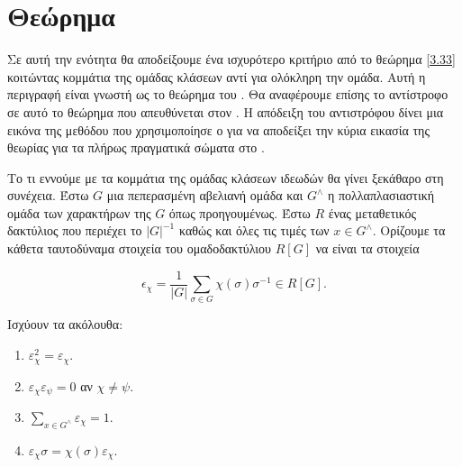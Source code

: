 \section{Θεώρημα }


\noindent Σε αυτή την ενότητα θα αποδείξουμε ένα ισχυρότερο κριτήριο από το θεώρημα \ref{3.33} κοιτώντας κομμάτια της ομάδας 
κλάσεων αντί για ολόκληρη την ομάδα. Αυτή η περιγραφή είναι γνωστή ως το θεώρημα του . 
Θα αναφέρουμε επίσης το αντίστροφο σε αυτό το θεώρημα που απευθύνεται στον  \cite{Ribet}. Η απόδειξη του αντιστρόφου 
δίνει μια εικόνα της μεθόδου που χρησιμοποίησε ο  για να αποδείξει την κύρια εικασία της θεωρίας  για τα 
πλήρως πραγματικά σώματα στο \cite{Wiles2}.

Το τι εννούμε με τα κομμάτια της ομάδας κλάσεων ιδεωδών θα γίνει ξεκάθαρο στη συνέχεια. Έστω $G$ μια πεπερασμένη αβελιανή 
ομάδα και $G^\wedge$ η πολλαπλασιαστική ομάδα των χαρακτήρων της $G$ όπως προηγουμένως. Έστω $R$ ένας μεταθετικός δακτύλιος 
που περιέχει το $|G|^{-1}$ καθώς και όλες τις τιμές των $x \in G^{\wedge}$. Ορίζουμε τα κάθετα ταυτοδύναμα στοιχεία του 
ομαδοδακτύλιου $R[G]$ να είναι τα στοιχεία

$$\epsilon_{\chi} = \frac{1}{|G|} \sum\limits_{\sigma \in G} \chi(\sigma)\sigma^{-1} \in R[G].$$

\begin{prop} Ισχύουν τα ακόλουθα:
	\begin{enumerate}
		\item $\varepsilon^2_{\chi} = \varepsilon_\chi$.
		\item $\varepsilon_\chi \varepsilon_\psi = 0$ αν $\chi \neq \psi$.
		\item $\sum\limits_{x\in G^{\wedge}} \varepsilon_\chi = 1$.
		\item $\varepsilon_\chi \sigma = \chi(\sigma) \varepsilon_\chi$.
		
	\end{enumerate}
\end{prop}


